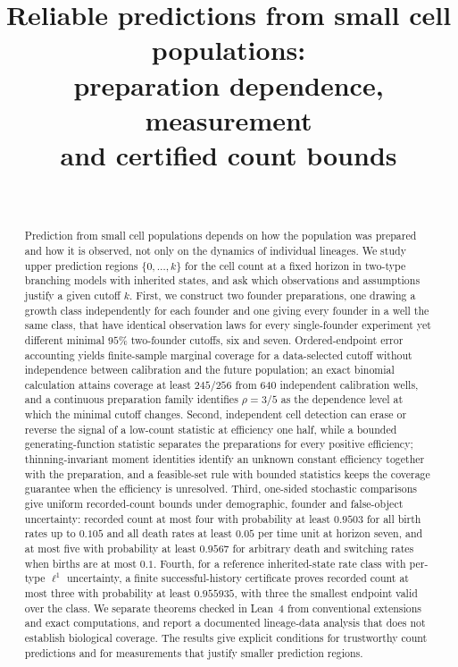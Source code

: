 \documentclass[11pt,a4paper]{article}
\title{Reliable predictions from small cell populations:\\ preparation dependence, measurement\\ and certified count bounds}
\author{\PaperAuthor\\[2pt] {\small\itshape \PaperAffiliation}}
\date{\PaperDate}
\theoremstyle{plain}
\theoremstyle{definition}
\theoremstyle{remark}
\begin{document}
\maketitle

\begin{abstract}
Prediction from small cell populations depends on how the population was prepared and how it is observed, not only on the dynamics of individual lineages. We study upper prediction regions $\{0,\dots,k\}$ for the cell count at a fixed horizon in two-type branching models with inherited states, and ask which observations and assumptions justify a given cutoff $k$. First, we construct two founder preparations, one drawing a growth class independently for each founder and one giving every founder in a well the same class, that have identical observation laws for every single-founder experiment yet different minimal $95\%$ two-founder cutoffs, six and seven. Ordered-endpoint error accounting yields finite-sample marginal coverage for a data-selected cutoff without independence between calibration and the future population; an exact binomial calculation attains coverage at least $245/256$ from $640$ independent calibration wells, and a continuous preparation family identifies $\rho=3/5$ as the dependence level at which the minimal cutoff changes. Second, independent cell detection can erase or reverse the signal of a low-count statistic at efficiency one half, while a bounded generating-function statistic separates the preparations for every positive efficiency; thinning-invariant moment identities identify an unknown constant efficiency together with the preparation, and a feasible-set rule with bounded statistics keeps the coverage guarantee when the efficiency is unresolved. Third, one-sided stochastic comparisons give uniform recorded-count bounds under demographic, founder and false-object uncertainty: recorded count at most four with probability at least $0.9503$ for all birth rates up to $0.105$ and all death rates at least $0.05$ per time unit at horizon seven, and at most five with probability at least $0.9567$ for arbitrary death and switching rates when births are at most $0.1$. Fourth, for a reference inherited-state rate class with per-type $\ell^1$ uncertainty, a finite successful-history certificate proves recorded count at most three with probability at least $0.955935$, with three the smallest endpoint valid over the class. We separate theorems checked in Lean~4 from conventional extensions and exact computations, and report a documented lineage-data analysis that does not establish biological coverage. The results give explicit conditions for trustworthy count predictions and for measurements that justify smaller prediction regions.
\end{abstract}
\end{document}

